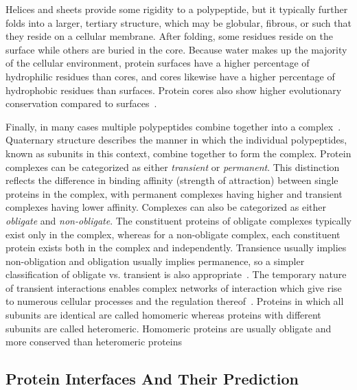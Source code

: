 Helices and sheets provide some rigidity to a polypeptide, but it typically further folds into a larger, tertiary structure, which may be globular, fibrous, or such that they reside on a cellular membrane.
After folding, some residues reside on the surface while others are buried in the core.
Because water makes up the majority of the cellular environment, protein surfaces have a higher percentage of hydrophilic residues than cores, and cores likewise have a higher percentage of hydrophobic residues than surfaces. 
Protein cores also show higher evolutionary conservation compared to surfaces~\cite{yan2008}.


Finally, in many cases multiple polypeptides combine together into a complex~\cite{scheeffink2003}.
Quaternary structure describes the manner in which the individual polypeptides, known as subunits in this context, combine together to form the complex.
Protein complexes can be categorized as either \textit{transient} or \textit{permanent}.
This distinction reflects the difference in binding affinity (strength of attraction) between single proteins in the complex, with permanent complexes having higher and transient complexes having lower affinity.
Complexes can also be categorized as either \textit{obligate} and \textit{non-obligate}.
The constituent proteins of obligate complexes typically exist only in the complex, whereas for a non-obligate complex, each constituent protein exists both in the complex and independently.
Transience usually implies non-obligation and obligation usually implies permanence, so a simpler classification of obligate vs. transient is also appropriate~\cite{jones1996, perkins2010}.
The temporary nature of transient interactions enables complex networks of interaction which give rise to numerous cellular processes and the regulation thereof~\cite{perkins2010, ofran2003}.
Proteins in which all subunits are identical are called homomeric whereas proteins with different subunits are called heteromeric.
Homomeric proteins are usually obligate and more conserved than heteromeric proteins~\cite{jones1996}\cite{yan2008}



\subsection{Protein Interfaces And Their Prediction}

